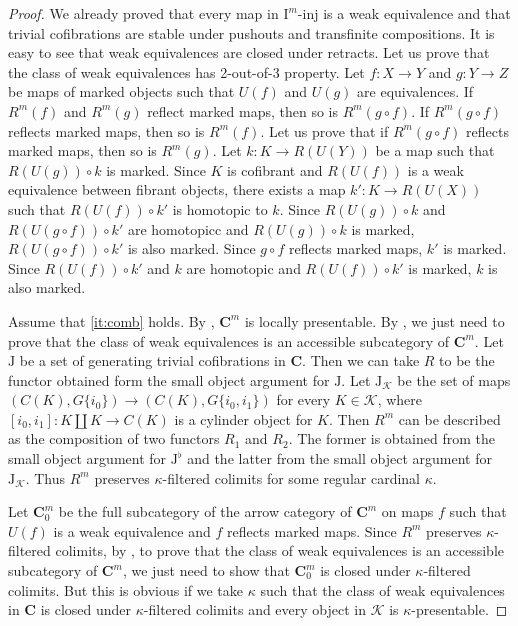 \documentclass[reqno]{amsart}
\theoremstyle{definition}
\theoremstyle{remark}
\newcommand{\cat}[1]{\mathbf{#1}}
\newcommand{\C}{\cat{C}}
\newcommand{\I}{\mathrm{I}}
\newcommand{\J}{\mathrm{J}}
\newcommand{\class}[2]{#1\text{-}\mathrm{#2}}
\newcommand{\Iinj}[1][\I]{\class{#1}{inj}}
\numberwithin{figure}{section}
\begin{document}
\begin{proof}
We already proved that every map in $\Iinj[\I^m]$ is a weak equivalence and that trivial cofibrations are stable under pushouts and transfinite compositions.
It is easy to see that weak equivalences are closed under retracts.
Let us prove that the class of weak equivalences has 2-out-of-3 property.
Let $f : X \to Y$ and $g : Y \to Z$ be maps of marked objects such that $U(f)$ and $U(g)$ are equivalences.
If $R^m(f)$ and $R^m(g)$ reflect marked maps, then so is $R^m(g \circ f)$.
If $R^m(g \circ f)$ reflects marked maps, then so is $R^m(f)$.
Let us prove that if $R^m(g \circ f)$ reflects marked maps, then so is $R^m(g)$.
Let $k : K \to R(U(Y))$ be a map such that $R(U(g)) \circ k$ is marked.
Since $K$ is cofibrant and $R(U(f))$ is a weak equivalence between fibrant objects,
there exists a map $k' : K \to R(U(X))$ such that $R(U(f)) \circ k'$ is homotopic to $k$.
Since $R(U(g)) \circ k$ and $R(U(g \circ f)) \circ k'$ are homotopicc and $R(U(g)) \circ k$ is marked, $R(U(g \circ f)) \circ k'$ is also marked.
Since $g \circ f$ reflects marked maps, $k'$ is marked.
Since $R(U(f)) \circ k'$ and $k$ are homotopic and $R(U(f)) \circ k'$ is marked, $k$ is also marked.

Assume that \eqref{it:comb} holds.
By , $\C^m$ is locally presentable.
By , we just need to prove that the class of weak equivalences is an accessible subcategory of $\C^m$.
Let $\J$ be a set of generating trivial cofibrations in $\C$.
Then we can take $R$ to be the functor obtained form the small object argument for $\J$.
Let $\J_\mathcal{K}$ be the set of maps $(C(K), G \{i_0\}) \to (C(K), G \{i_0,i_1\})$ for every $K \in \mathcal{K}$, where $[i_0,i_1] : K \amalg K \to C(K)$ is a cylinder object for $K$.
Then $R^m$ can be described as the composition of two functors $R_1$ and $R_2$.
The former is obtained from the small object argument for $\J^\flat$ and the latter from the small object argument for $\J_\mathcal{K}$.
Thus $R^m$ preserves $\kappa$-filtered colimits for some regular cardinal $\kappa$.

Let $\C^m_0$ be the full subcategory of the arrow category of $\C^m$ on maps $f$ such that $U(f)$ is a weak equivalence and $f$ reflects marked maps.
Since $R^m$ preserves $\kappa$-filtered colimits, by \cite[Corollary~A.2.6.5]{lurie-topos},
to prove that the class of weak equivalences is an accessible subcategory of $\C^m$,
we just need to show that $\C^m_0$ is closed under $\kappa$-filtered colimits.
But this is obvious if we take $\kappa$ such that the class of weak equivalences in $\C$
is closed under $\kappa$-filtered colimits and every object in $\mathcal{K}$ is $\kappa$-presentable.


\end{proof}
\end{document}

